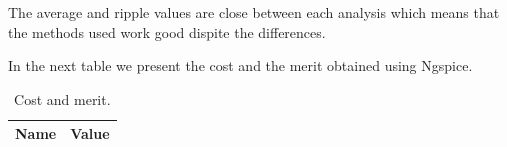 The average and ripple values are close between each analysis which means that the methods used work good dispite the differences.

In the next table we present the cost and the merit obtained using Ngspice. 
\vspace{1cm}
\begin{table}[h]
  \centering
  \begin{tabular}{|l|r|}
    \hline    
    {\bf Name} & {\bf Value} \\ \hline
    
  \end{tabular}
  \caption{Cost and merit.}
  \label{tab:6}
\end{table}








